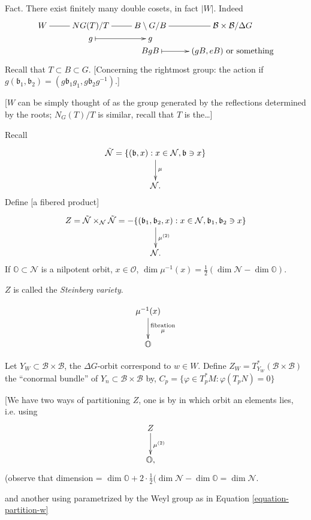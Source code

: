 \noindent
Fact. There exist finitely many double
cosets, in fact $|W|$. Indeed
$$
\xymatrix@R=0.1em{
W\ar@{-}[r]
&NG(T)/T\ar@{-}[r]
&  B\setminus G / B \ar@{-}[r]
& \mathcal{B}\times \mathcal{B}/\Delta G\\
&g \ar@{|->}[r]& g\\
& & BgB \ar@{|->}[r]
&(gB,eB)\text{ or something}
}
$$
Recall that $T \subset B \subset G$.
[Concerning the rightmost group: the action
if $g(\mathfrak{b}_1,\mathfrak{b}_2)
=(g\mathfrak{b}_1g_1,g\mathfrak{b}_2g^{-1})
$.]

[$W$ can be simply thought of as the group
generated by the reflections determined by
the roots; $N_G(T)/T$ is similar, recall that
$T$ is the\ldots{}]

\medskip{}

Recall
$$
\xymatrix{
\tilde{\mathcal{N}}=
\{(\mathfrak{b},x):x \in \mathcal{N},
\mathfrak{b} \ni x\}
\ar[d]^{\mu}\\
\mathcal{N}.
}
$$
Define [a fibered product]
$$
\xymatrix{
Z=\tilde{\mathcal{N}}\times_{\mathcal{N}}
\tilde{\mathcal{N}}
=- \{(\mathfrak{b}_1,\mathfrak{b}_2,x):
x \in \mathcal{N},
\mathfrak{b}_1,\mathfrak{b}_2 \ni x\}
\ar[d]^{\mu^{(2)}}\\
\mathcal{N}.
}
$$
If $\mathbb{O}\subset \mathcal{N}$ is a
nilpotent orbit, $x \in \mathbb{
\mathcal{O}}$,
$\dim \mu^{-1}(x)=\frac{1}{2}(\dim
\mathcal{N} - \dim \mathbb{ O})$.

$Z$ is called the {\it Steinberg variety}.

$$
\xymatrix{
\mu^{-1}(x)\ar[d]
^{\substack{\text{fibration}
\\ \mu}}\\
\mathbb{O}
}
$$

\medskip\noindent
Let $Y_W \subset \mathcal{B} \times
\mathcal{B}$,
the $\Delta G$-orbit correspond to $w \in W$.
Define $Z_W = T^*_{Y_W}(\mathcal{B} \times
\mathcal{B})$
the  ``conormal bundle'' of $Y_n \subset
\mathcal{B} \times \mathcal{B}$
by, $C_p=\{ \varphi \in T^*_pM:
\varphi(T_p N)=0\}$

[We have two ways of partitioning $Z$, one is
by in which orbit an elements lies, i.e.
using
$$
\xymatrix{
Z\ar[d]^{\mu^{(2)}}\\
\mathbb{O},
}
$$
(observe that dimension = $\dim
\mathbb{O}+2\cdot \frac{1}{2}
(\dim \mathcal{N}-\dim \mathbb{ O}=\dim
\mathcal{N}$.


and another using parametrized by the Weyl
group as in Equation
\ref{equation-partition-w}

